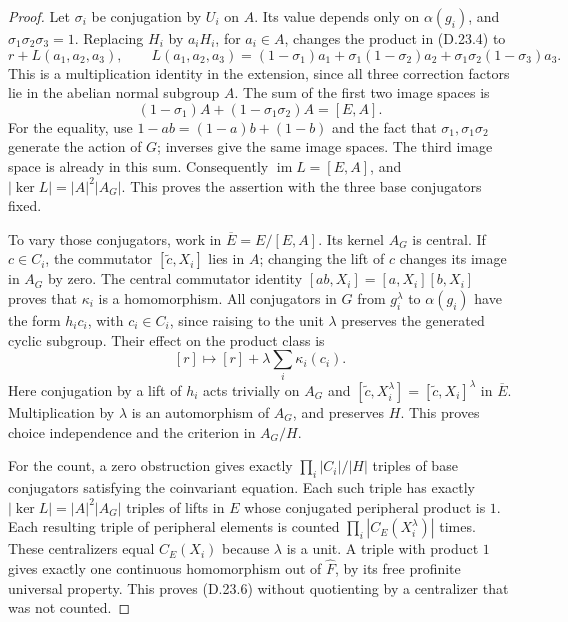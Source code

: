 \begin{proof}
Let $\sigma_i$ be conjugation by $U_i$ on $A$.  Its value depends
only on $\alpha(g_i)$, and
$\sigma_1\sigma_2\sigma_3=1$.  Replacing $H_i$ by $a_iH_i$, for
$a_i\in A$, changes the product in \textup{(D.23.4)} to
\[
 r+L(a_1,a_2,a_3),\qquad
 L(a_1,a_2,a_3)=(1-\sigma_1)a_1
       +\sigma_1(1-\sigma_2)a_2
       +\sigma_1\sigma_2(1-\sigma_3)a_3.
 \tag{D.23.8}
\]
This is a multiplication identity in the extension, since all three
correction factors lie in the abelian normal subgroup $A$.
The sum of the first two image spaces is
\[
 (1-\sigma_1)A+(1-\sigma_1\sigma_2)A=[E,A].
\]
For the equality, use $1-ab=(1-a)b+(1-b)$ and the fact that
$\sigma_1,\sigma_1\sigma_2$ generate the action of $G$; inverses
give the same image spaces.  The third image space is already in
this sum.  Consequently $\operatorname{im}L=[E,A]$, and
$|\ker L|=|A|^2|A_G|$.  This proves the assertion with the three
base conjugators fixed.

To vary those conjugators, work in $\overline E=E/[E,A]$.
Its kernel $A_G$ is central.  If $c\in C_i$, the commutator
$[\widetilde c,X_i]$ lies in $A$; changing the lift of $c$ changes
its image in $A_G$ by zero.  The central commutator identity
$[ab,X_i]=[a,X_i][b,X_i]$ proves that $\kappa_i$ is a homomorphism.
All conjugators in $G$ from $g_i^\lambda$ to $\alpha(g_i)$ have
the form $h_ic_i$, with $c_i\in C_i$, since raising to the unit
$\lambda$ preserves the generated cyclic subgroup.  Their effect
on the product class is
\[
 [r]\longmapsto[r]+\lambda\sum_i\kappa_i(c_i).
 \tag{D.23.9}
\]
Here conjugation by a lift of $h_i$ acts trivially on $A_G$ and
$[\widetilde c,X_i^\lambda]=[\widetilde c,X_i]^\lambda$ in
$\overline E$.  Multiplication by $\lambda$ is an automorphism of
$A_G$, and preserves $H$.  This proves choice independence and the
criterion in $A_G/H$.

For the count, a zero obstruction gives exactly
$\prod_i|C_i|/|H|$ triples of base conjugators satisfying the
coinvariant equation.  Each such triple has exactly
$|\ker L|=|A|^2|A_G|$ triples of lifts in $E$ whose conjugated
peripheral product is $1$.  Each resulting triple of peripheral
elements is counted $\prod_i|C_E(X_i^\lambda)|$
times.  These centralizers equal $C_E(X_i)$ because $\lambda$ is a
unit.  A triple with product $1$ gives exactly one continuous
homomorphism out of $\widehat F$, by its free profinite universal
property.  This proves \textup{(D.23.6)} without quotienting by a
centralizer that was not counted.


\end{proof}
